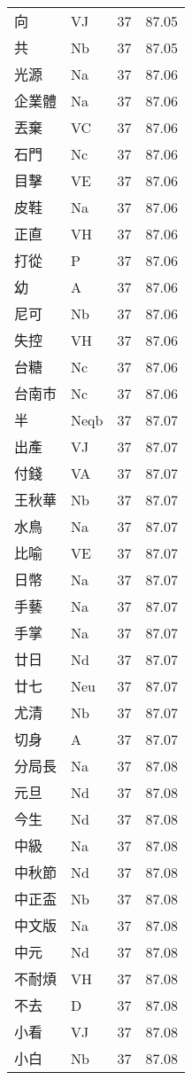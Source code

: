 \documentclass[twocolumn]{book}
\begin{document}
\begin{supertabular}{llrr}
向 & VJ & 37 &  87.05\\
共 & Nb & 37 &  87.05\\
光源 & Na & 37 &  87.06\\
企業體 & Na & 37 &  87.06\\
丟棄 & VC & 37 &  87.06\\
石門 & Nc & 37 &  87.06\\
目擊 & VE & 37 &  87.06\\
皮鞋 & Na & 37 &  87.06\\
正直 & VH & 37 &  87.06\\
打從 & P & 37 &  87.06\\
幼 & A & 37 &  87.06\\
尼可 & Nb & 37 &  87.06\\
失控 & VH & 37 &  87.06\\
台糖 & Nc & 37 &  87.06\\
台南市 & Nc & 37 &  87.06\\
半 & Neqb & 37 &  87.07\\
出產 & VJ & 37 &  87.07\\
付錢 & VA & 37 &  87.07\\
王秋華 & Nb & 37 &  87.07\\
水鳥 & Na & 37 &  87.07\\
比喻 & VE & 37 &  87.07\\
日幣 & Na & 37 &  87.07\\
手藝 & Na & 37 &  87.07\\
手掌 & Na & 37 &  87.07\\
廿日 & Nd & 37 &  87.07\\
廿七 & Neu & 37 &  87.07\\
尤清 & Nb & 37 &  87.07\\
切身 & A & 37 &  87.07\\
分局長 & Na & 37 &  87.08\\
元旦 & Nd & 37 &  87.08\\
今生 & Nd & 37 &  87.08\\
中級 & Na & 37 &  87.08\\
中秋節 & Nd & 37 &  87.08\\
中正盃 & Nb & 37 &  87.08\\
中文版 & Na & 37 &  87.08\\
中元 & Nd & 37 &  87.08\\
不耐煩 & VH & 37 &  87.08\\
不去 & D & 37 &  87.08\\
小看 & VJ & 37 &  87.08\\
小白 & Nb & 37 &  87.08\\

\end{supertabular}
\end{document}
